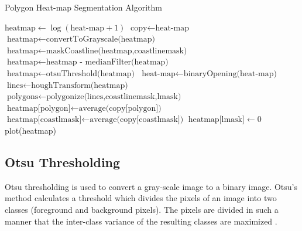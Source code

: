 \documentclass{article}
\begin{document}
\begin{algorithm}
 \caption{Polygon Heat-map Segmentation Algorithm}\label{euclid}
 \begin{algorithmic}[1]
 \State $\textrm{heatmap} \gets \log(\textrm{heat-map}+1)$
 \State $\textrm{copy} \gets \textrm{heat-map}$
 \State $\textrm{heatmap} \gets \textrm{convertToGrayscale(heatmap)}$
 \State $\textrm{heatmap} \gets \textrm{maskCoastline(heatmap,coastlinemask)}$
 \State $\textrm{heatmap} \gets \textrm{heatmap - medianFilter(heatmap)}$ 
 \State $\textrm{heatmap} \gets \textrm{otsuThreshold(heatmap)}$
 \State $\textrm{heat-map} \gets \textrm{binaryOpening(heat-map)}$
 \State $\textrm{lines} \gets \textrm{houghTransform(heatmap)}$
 \State $\textrm{polygons} \gets \textrm{polygonize(lines,coastlinemask,lmask)}$
     \State $\textrm{heatmap[polygon]} \gets \textrm{average(copy[polygon])}$ 
 \EndFor
 \State $\textrm{heatmap[coastlmask]} \gets \textrm{average(copy[coastlmask])}$
 \State $\textrm{heatmap[lmask]} \gets 0$
 \State plot(heatmap)
 
 \EndProcedure
 \end{algorithmic}
 \end{algorithm}


\subsection{Otsu Thresholding}
Otsu thresholding is used to convert a gray-scale image to a binary image. Otsu's method calculates a threshold which divides 
the pixels of an image into two classes (foreground and background pixels). The pixels are divided in such a manner that the inter-class variance 
of the resulting classes are maximized \cite{otsu1979}. 
\end{document}
